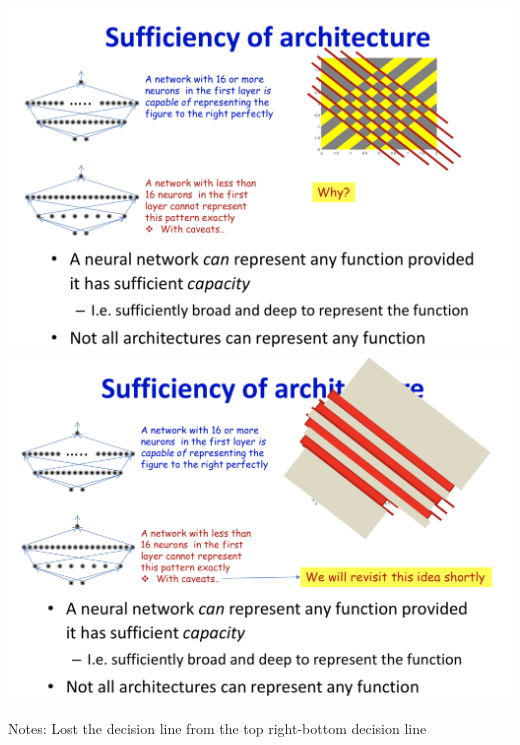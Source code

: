 \documentclass{article}
\begin{document}
	\includegraphics[scale=0.2]{35.png}
	\includegraphics[scale=0.2]{36.png}
	
	Notes: Lost the decision line from the top right-bottom decision line
	
\end{document}
